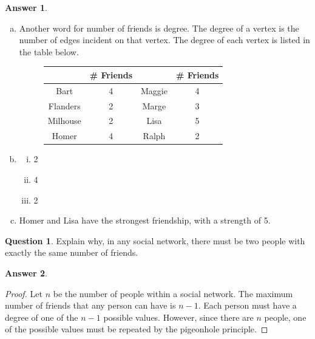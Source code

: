 \documentclass[article, 12pt]{article}
\theoremstyle{definition}
\newtheorem{question}{Question}
\newtheorem{answer}{Answer}
\begin{document}
    \begin{answer} \
        \begin{enumerate}[(a)]
            \item Another word for number of friends is degree. The degree of a vertex is the number of edges incident on that vertex. The degree of each vertex is listed in the table below.             
            \begin{figure}[H]
                \centering
                \begin{tabular}{|c|c|c|c|}
                    \hline
                    & \# Friends & & \# Friends \\
                    \hline
                    Bart & 4 & Maggie & 4 \\
                    \hline
                    Flanders & 2 & Marge & 3 \\
                    \hline
                    Milhouse & 2 & Lisa & 5 \\
                    Homer & 4 & Ralph & 2 \\
                    \hline
                \end{tabular}
            \end{figure}
            \item \begin{enumerate}[(i)]
                \item 2
                \item 4
                \item 2
            \end{enumerate}
            \item Homer and Lisa have the strongest friendship, with a strength of 5.
        \end{enumerate}
    \end{answer}
    \begin{question}
        Explain why, in any social network, there must be two people with exactly the same number of friends.
    \end{question}
    \begin{answer}
        \begin{proof}
            Let $n$ be the number of people within a social network. The maximum number of friends that any person can have is $n-1$. Each person must have a degree of one of the $n-1$ possible values. However, since there are $n$ people, one of the possible values must be repeated by the pigeonhole principle.
        \end{proof}
    \end{answer}
\end{document}
